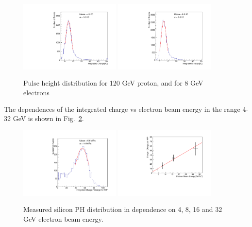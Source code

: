 \documentclass[12pt]{article}
\begin{document}
\begin{figure}[htbp] 
\centering
\includegraphics[width=0.45\textwidth]{plots/Proton_charge.pdf} 
\includegraphics[width=0.45\textwidth]{plots/Electron_0X0_charge.pdf} 
\caption{Pulse height distribution for 120 GeV proton, and for  8 GeV electrons} 
\label{fig:MIP} 
\end{figure} 

The dependences of the integrated charge vs electron beam energy in the range
4-32 GeV is shown in Fig.~\ref{fig:MIPVsEnergy}.

\begin{figure}[htbp] 
\centering
\includegraphics[width=0.45\textwidth]{plots/Electron_6X0_32GeV_chargeMIP.pdf} 
\includegraphics[width=0.45\textwidth]{plots/MIPVsEnergyAt6X0.pdf} 
\caption{Measured silicon PH distribution in dependence on 4, 8, 16 and 32 GeV electron beam energy.} 
\label{fig:MIPVsEnergy} 
\end{figure} 
\end{document}
